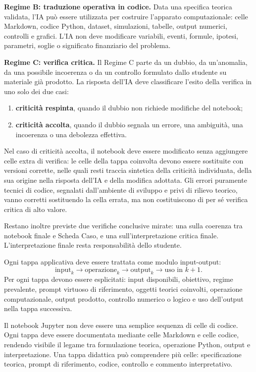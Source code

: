 \documentclass[12pt,a4paper]{article}%
\newcommand{\1}{\mathbf{1}}
\begin{document}
\medskip
\noindent
\textbf{Regime B: traduzione operativa in codice.}
Data una specifica teorica validata, l'IA pu\`{o} essere utilizzata per
costruire l'apparato computazionale: celle Markdown, codice Python,
dataset, simulazioni, tabelle, output numerici, controlli e grafici.
L'IA non deve modificare variabili, eventi, formule, ipotesi, parametri,
soglie o significato finanziario del problema.

\medskip
\noindent
\textbf{Regime C: verifica critica.}
Il Regime C parte da un dubbio, da un'anomalia, da una possibile
incoerenza o da un controllo formulato dallo studente su materiale gi\`{a}
prodotto. La risposta dell'IA deve classificare l'esito della verifica in
uno solo dei due casi:
\begin{enumerate}
\item \textbf{criticità respinta}, quando il dubbio non richiede modifiche
del notebook;
\item \textbf{criticità accolta}, quando il dubbio segnala un errore, una
ambiguit\`{a}, una incoerenza o una debolezza effettiva.
\end{enumerate}
Nel caso di criticità accolta, il notebook deve essere modificato senza
aggiungere celle extra di verifica: le celle della tappa coinvolta devono
essere sostituite con versioni corrette, nelle quali resti traccia sintetica
della criticità individuata, della sua origine nella risposta dell'IA e
della modifica adottata. Gli errori puramente tecnici di codice, segnalati
dall'ambiente di sviluppo e privi di rilievo teorico, vanno corretti
sostituendo la cella errata, ma non costituiscono di per s\'{e} verifica
critica di alto valore.

Restano inoltre previste due verifiche conclusive mirate: una sulla
coerenza tra notebook finale e Scheda Caso, e una sull'interpretazione
critica finale. L'interpretazione finale resta responsabilit\`{a} dello
studente.

Ogni tappa applicativa deve essere trattata come modulo input-output:
\[
\text{input}_{k}
\longrightarrow
\text{operazione}_{k}
\longrightarrow
\text{output}_{k}
\longrightarrow
\text{uso in } k+1.
\]
Per ogni tappa devono essere esplicitati: input disponibili, obiettivo,
regime prevalente, prompt virtuoso di riferimento, oggetti teorici coinvolti,
operazione computazionale, output prodotto, controllo numerico o logico e uso
dell'output nella tappa successiva.

Il notebook Jupyter non deve essere una semplice sequenza di celle di codice.
Ogni tappa deve essere documentata mediante celle Markdown e celle codice,
rendendo visibile il legame tra formulazione teorica, operazione Python, output
e interpretazione. Una tappa didattica pu\`{o} comprendere pi\`{u} celle:
specificazione teorica, prompt di riferimento, codice, controllo e commento
interpretativo.
\end{document}
